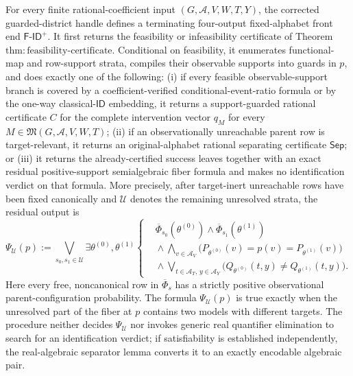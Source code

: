 For every finite rational-coefficient input \((G,\mathcal A,V,W,T,Y)\), the corrected guarded-district handle defines a terminating four-output fixed-alphabet front end \(\mathsf{F\text{-}ID}^{+}\). It first returns the feasibility or infeasibility certificate of Theorem \(\mathrm{thm:feasibility\text{-}certificate}\). Conditional on feasibility, it enumerates functional-map and row-support strata, compiles their observable supports into guards in \(p\), and does exactly one of the following: (i) if every feasible observable-support branch is covered by a coefficient-verified conditional-event-ratio formula or by the one-way classical-\(\mathsf{ID}\) embedding, it returns a support-guarded rational certificate \(C\) for the complete intervention vector \(q_M\) for every \(M\in\mathfrak M(G,\mathcal A,V,W,T)\); (ii) if an observationally unreachable parent row is target-relevant, it returns an original-alphabet rational separating certificate \(\mathsf{Sep}\); or (iii) it returns the already-certified success leaves together with an exact residual positive-support semialgebraic fiber formula and makes no identification verdict on that formula. More precisely, after target-inert unreachable rows have been fixed canonically and \(\mathcal U\) denotes the remaining unresolved strata, the residual output is
\[
 \Psi_{\mathcal U}(p)
 :=
 \bigvee_{s_0,s_1\in\mathcal U}
 \exists\theta^{(0)},\theta^{(1)}
 \left\{
 \begin{aligned}
 &\overline\Phi_{s_0}(\theta^{(0)})\wedge
   \overline\Phi_{s_1}(\theta^{(1)})\\
 &{}\wedge\bigwedge_{v\in\mathcal A_V}
   \bigl(P_{\theta^{(0)}}(v)=p(v)=P_{\theta^{(1)}}(v)\bigr)\\
 &{}\wedge\bigvee_{t\in\mathcal A_T,\,y\in\mathcal A_Y}
   \bigl(Q_{\theta^{(0)}}(t,y)\ne Q_{\theta^{(1)}}(t,y)\bigr).
 \end{aligned}
 \right.
\]
Here every free, noncanonical row in \(\overline\Phi_s\) has a strictly positive observational parent-configuration probability. The formula \(\Psi_{\mathcal U}(p)\) is true exactly when the unresolved part of the fiber at \(p\) contains two models with different targets. The procedure neither decides \(\Psi_{\mathcal U}\) nor invokes generic real quantifier elimination to search for an identification verdict; if satisfiability is established independently, the real-algebraic separator lemma converts it to an exactly encodable algebraic pair.

